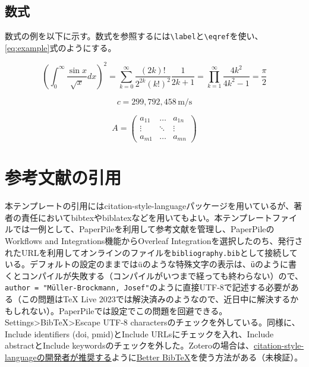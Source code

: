 \documentclass[fontsize=9pt, jafontscale=.95, twocolumn, a4paper]{jlreq}
\begin{document}
\subsection*{数式}

数式の例を以下に示す。数式を参照するには\verb|\label|と\verb|\eqref|を使い、\eqref{eq:example}式のようにする。

\begin{equation}
\left( \int_0^\infty \frac{\sin x}{\sqrt{x}} dx \right)^2=
\sum_{k=0}^\infty \frac{(2k)!}{2^{2k}(k!)^2} \frac{1}{2k+1}=
\prod_{k=1}^\infty \frac{4k^2}{4k^2 -1}= \frac{\pi}{2} \label{eq:example}
\end{equation}

\begin{equation}
  c = 299{,}792{,}458 \, \mathrm{m/s}
\end{equation}

\begin{equation}
  A = \begin{pmatrix}
        a_{11} & \ldots & a_{1n} \\
        \vdots & \ddots & \vdots \\
        a_{m1} & \ldots & a_{mn}
      \end{pmatrix}
\end{equation}

\section{参考文献の引用}

本テンプレートの引用にはcitation-style-languageパッケージを用いているが、著者の責任においてbibtexやbiblatexなどを用いてもよい。本テンプレートファイルでは一例として、PaperPileを利用して参考文献を管理し、PaperPileのWorkflows and Integrations機能からOverleaf Integrationを選択したのち、発行されたURLを利用してオンラインのファイルを\verb|bibliography.bib|として接続している。デフォルトの設定のままでは\"{u}のような特殊文字の表示は、\texttt{\"{u}}のように書くとコンパイルが失敗する（コンパイルがいつまで経っても終わらない）ので、\texttt{author = "Müller-Brockmann, Josef"}のように直接UTF-8で記述する必要がある（この問題はTeX Live 2023では解決済みのようなので、近日中に解決するかもしれない）。PaperPileでは設定でこの問題を回避できる。Settings\textgreater BibTeX\textgreater Escape UTF-8 charactersのチェックを外している。同様に、Include identifiers (doi, pmid)とInclude URLsにチェックを入れ、Include abstractとInclude keywordsのチェックを外した。Zoteroの場合は、\href{https://github.com/zepinglee/citeproc-lua/issues/24}{citation-style-languageの開発者が推奨する}ように\href{https://retorque.re/zotero-better-bibtex/}{Better BibTeX}を使う方法がある（未検証）。
\end{document}
